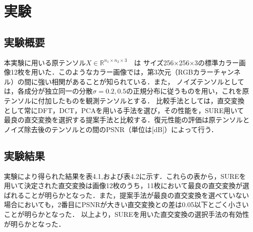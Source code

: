 
\chapter{実験}
\section{実験概要}
本実験に用いる原テンソル$X∈\mathbb{R}^{n_1\times n_2\times 3}$　は
サイズ256×256×3の標準カラー画像12枚を用いた．このようなカラー画像では，第3次元（RGBカラーチャンネル）の間に強い相関があることが知られている．また，
ノイズテンソルとしては，各成分が独立同一の分散$\sigma=0.2, 0.5$の正規分布に従うものを用い，これを原テンソルに付加したものを観測テンソルとする．
比較手法としては，直交変換として常にDFT，DCT，PCAを用いる手法を選び，その性能を，SURE用いて最良の直交変換を選択する提案手法と比較する．復元性能の評価は原テンソルとノイズ除去後のテンソルとの間のPSNR（単位は[dB]）によって行う．

\section{実験結果}
実験により得られた結果を表4.1,および表4.2に示す．これらの表から，SUREを用いて決定された直交変換は画像12枚のうち，11枚において最良の直交変換が選ばれることが明らかとなった．また，提案手法が最良の直交変換を選べていない場合においても，2番目にPSNRが大きい直交変換との差は0.05以下とごく小さいことが明らかとなった．
以上より，SUREを用いた直交変換の選択手法の有効性が明らかとなった．

